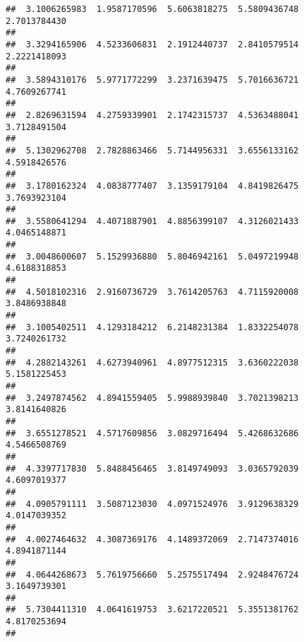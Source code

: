 \documentclass[]{article}
\begin{document}
\begin{verbatim}
##  3.1006265983  1.9587170596  5.6063818275  5.5809436748  2.7013784430 
##                                                                       
##  3.3294165906  4.5233606831  2.1912440737  2.8410579514  2.2221418093 
##                                                                       
##  3.5894310176  5.9771772299  3.2371639475  5.7016636721  4.7609267741 
##                                                                       
##  2.8269631594  4.2759339901  2.1742315737  4.5363488041  3.7128491504 
##                                                                       
##  5.1302962708  2.7828863466  5.7144956331  3.6556133162  4.5918426576 
##                                                                       
##  3.1780162324  4.0838777407  3.1359179104  4.8419826475  3.7693923104 
##                                                                       
##  3.5580641294  4.4071887901  4.8856399107  4.3126021433  4.0465148871 
##                                                                       
##  3.0048600607  5.1529936880  5.8046942161  5.0497219948  4.6188318853 
##                                                                       
##  4.5018102316  2.9160736729  3.7614205763  4.7115920008  3.8486938848 
##                                                                       
##  3.1005402511  4.1293184212  6.2148231384  1.8332254078  3.7240261732 
##                                                                       
##  4.2882143261  4.6273940961  4.8977512315  3.6360222038  5.1581225453 
##                                                                       
##  3.2497874562  4.8941559405  5.9988939840  3.7021398213  3.8141640826 
##                                                                       
##  3.6551278521  4.5717609856  3.0829716494  5.4268632686  4.5466508769 
##                                                                       
##  4.3397717830  5.8488456465  3.8149749093  3.0365792039  4.6097019377 
##                                                                       
##  4.0905791111  3.5087123030  4.0971524976  3.9129638329  4.0147039352 
##                                                                       
##  4.0027464632  4.3087369176  4.1489372069  2.7147374016  4.8941871144 
##                                                                       
##  4.0644268673  5.7619756660  5.2575517494  2.9248476724  3.1649739301 
##                                                                       
##  5.7304411310  4.0641619753  3.6217220521  5.3551381762  4.8170253694 
##                                                                       

\end{verbatim}
\end{document}
